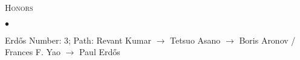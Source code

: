\documentclass[10pt]{article}
\newcommand{\lineunder}{\\\vspace{-9pt}\hrulefill}
\newcommand{\header}[1]{{\normalsize\scshape{#1}} \lineunder}
\newenvironment{achievements}{\begin{list}{$\bullet$}{\topsep 0pt \itemsep 0pt}}{\end{list}}
\begin{document}
\vspace{3pt}

\header{Honors}
\begin{achievements}
\item Erd\H{o}s Number: 3; Path: Revant Kumar $\rightarrow$ Tetsuo Asano $\rightarrow$ Boris Aronov / Frances F. Yao $\rightarrow$ Paul Erd\H{o}s
\end{achievements}


\end{document}
